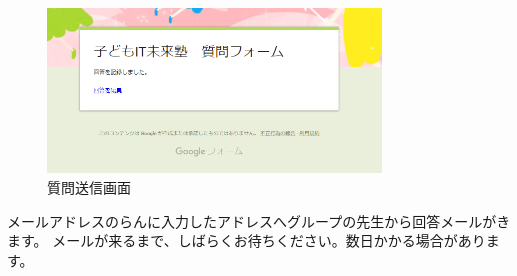 \begin{figure}[H]
  
    \begin{center}
      
      \includegraphics[width=8.871cm,height=4.374cm]{text04-img/textbook-img247.png}
      \caption{\label{fig:submit_question_view}質問送信画面}
    \end{center}
    
\end{figure}

メールアドレスのらんに入力したアドレスへグループの先生から回答メールがきます。
メールが来るまで、しばらくお待ちください。数日かかる場合があります。





